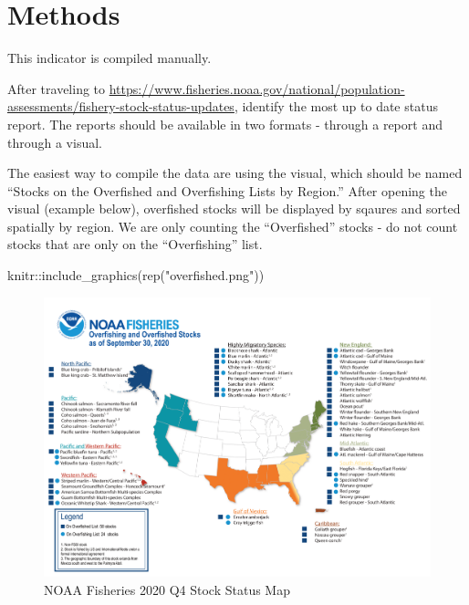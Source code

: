 \documentclass[
]{book}
\newenvironment{Shaded}{\begin{snugshade}}{\end{snugshade}}
\newcommand{\FunctionTok}[1]{\textcolor[rgb]{0.00,0.00,0.00}{#1}}
\newcommand{\NormalTok}[1]{#1}
\newcommand{\SpecialCharTok}[1]{\textcolor[rgb]{0.00,0.00,0.00}{#1}}
\newcommand{\StringTok}[1]{\textcolor[rgb]{0.31,0.60,0.02}{#1}}
\begin{document}
\hypertarget{methods-5}{%
\section{Methods}\label{methods-5}}

This indicator is compiled manually.

After traveling to \url{https://www.fisheries.noaa.gov/national/population-assessments/fishery-stock-status-updates}, identify the most up to date status report. The reports should be available in two formats - through a report and through a visual.

The easiest way to compile the data are using the visual, which should be named ``Stocks on the Overfished and Overfishing Lists by Region.'' After opening the visual (example below), overfished stocks will be displayed by sqaures and sorted spatially by region. We are only counting the ``Overfished'' stocks - do not count stocks that are only on the ``Overfishing'' list.

\begin{Shaded}
\begin{Highlighting}[]
\NormalTok{knitr}\SpecialCharTok{::}\FunctionTok{include\_graphics}\NormalTok{(}\FunctionTok{rep}\NormalTok{(}\StringTok{"overfished.png"}\NormalTok{))}
\end{Highlighting}
\end{Shaded}

\begin{figure}
\includegraphics[width=38.39in]{overfished} \caption{NOAA Fisheries 2020 Q4 Stock Status Map}\label{fig:unnamed-chunk-2}
\end{figure}
\end{document}
